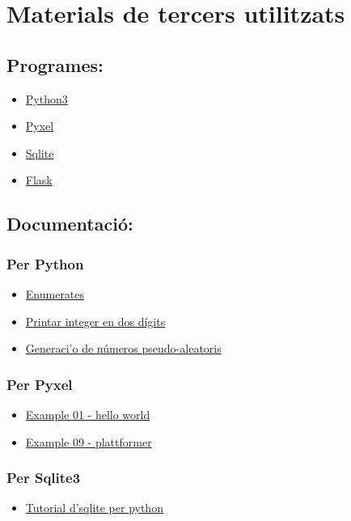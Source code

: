 
\section{Materials de tercers utilitzats}

\subsection{Programes:}
\begin{itemize}
\item{ \href{https://python.org/}{Python3} }
\item{ \href{https://github.com/kitao/pyxel}{Pyxel} }
\item{ \href{https://sqlite.org/}{Sqlite} }
\item{ \href{https://github.com/pallets/flask}{Flask} }

\end{itemize}


\subsection{Documentaci\'o:}

\subsubsection*{Per Python}
\begin{itemize}
\item{ \href{https://docs.python.org/3/library/enum.html}
{Enumerates}}
\item{ \href{https://stackoverflow.com/questions/64094654/python-converting-letter-to-two-digit-number}
{Printar integer en dos d\'igits}}
\item{ \href{https://docs.python.org/3/library/random.html}
{Generaci'o de n\'umeros pseudo-aleatoris}}
\end{itemize}


\subsubsection*{Per Pyxel}

\begin{itemize}
\item{\href{https://raw.githubusercontent.com/kitao/pyxel/main/python/pyxel/examples/01_hello_pyxel.py}
{Example 01 - hello world}}
\item{\href{https://raw.githubusercontent.com/kitao/pyxel/main/python/pyxel/examples/10_platformer.py}
{Example 09 - plattformer}}
\end{itemize}

\subsubsection*{Per Sqlite3}
\begin{itemize}
\item{\href{https://pynative.com/python-sqlite/}
{Tutorial d'sqlite per python}}
\end{itemize}




